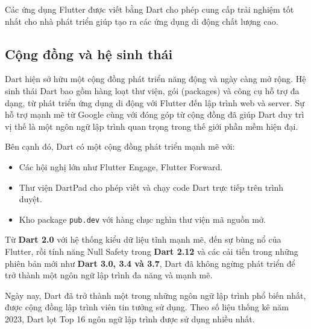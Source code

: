 \documentclass[../DoAn.tex]{subfiles}
\numberwithin{figure}{chapter}
\begin{document}
Các ứng dụng Flutter được viết bằng Dart cho phép cung cấp trải nghiệm tốt nhất cho nhà phát triển giúp tạo ra các ứng dụng di động chất lượng cao.

\subsection{Cộng đồng và hệ sinh thái}
Dart hiện sở hữu một cộng đồng phát triển năng động và ngày càng mở rộng. Hệ sinh thái Dart bao gồm hàng loạt thư viện, gói (packages) và công cụ hỗ trợ đa dạng, từ phát triển ứng dụng di động với Flutter đến lập trình web và server. Sự hỗ trợ mạnh mẽ từ Google cùng với đóng góp từ cộng đồng đã giúp Dart duy trì vị thế là một ngôn ngữ lập trình quan trọng trong thế giới phần mềm hiện đại.

Bên cạnh đó, Dart có một cộng đồng phát triển mạnh mẽ với:

\begin{itemize}
    \item Các hội nghị lớn như Flutter Engage, Flutter Forward.
    \item Thư viện DartPad cho phép viết và chạy code Dart trực tiếp trên trình duyệt.
    \item Kho package \texttt{pub.dev} với hàng chục nghìn thư viện mã nguồn mở.
\end{itemize}

Từ \textbf{Dart 2.0} với hệ thống kiểu dữ liệu tĩnh mạnh mẽ, đến sự bùng nổ của Flutter, rồi tính năng Null Safety trong \textbf{Dart 2.12} và các cải tiến trong những phiên bản mới như \textbf{Dart 3.0, 3.4 và 3.7}, Dart đã không ngừng phát triển để trở thành một ngôn ngữ lập trình đa năng và mạnh mẽ.

Ngày nay, Dart đã trở thành một trong những ngôn ngữ lập trình phổ biến nhất, được cộng đồng lập trình viên tin tưởng sử dụng. Theo số liệu thống kê năm 2023, Dart lọt Top 16 ngôn ngữ lập trình được sử dụng nhiều nhất.
\end{document}
